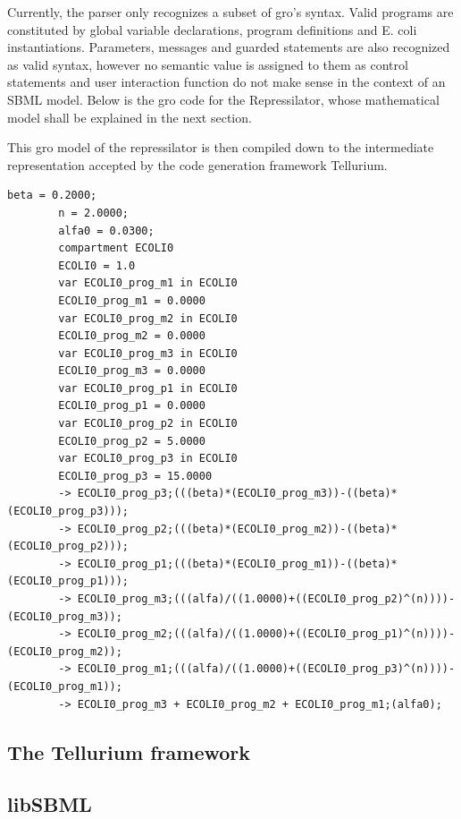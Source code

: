 \documentclass[12pt]{article}
\begin{document}
    Currently, the parser only recognizes a subset of gro's syntax. Valid programs are constituted by global variable declarations, program definitions and E. coli instantiations. Parameters, messages and guarded statements are also recognized as valid syntax, however no semantic value is assigned to them as control statements and user interaction function do not make sense in the context of an SBML model. Below is the gro code for the Repressilator, whose mathematical model shall be explained in the next section.
    
    
    
    This gro model of the repressilator is then compiled down to the intermediate representation accepted by the code generation framework Tellurium.
    
    \begin{lstlisting}[style=GROSRC]
        beta = 0.2000;
        n = 2.0000;
        alfa0 = 0.0300;
        compartment ECOLI0
        ECOLI0 = 1.0
        var ECOLI0_prog_m1 in ECOLI0
        ECOLI0_prog_m1 = 0.0000
        var ECOLI0_prog_m2 in ECOLI0
        ECOLI0_prog_m2 = 0.0000
        var ECOLI0_prog_m3 in ECOLI0
        ECOLI0_prog_m3 = 0.0000
        var ECOLI0_prog_p1 in ECOLI0
        ECOLI0_prog_p1 = 0.0000
        var ECOLI0_prog_p2 in ECOLI0
        ECOLI0_prog_p2 = 5.0000
        var ECOLI0_prog_p3 in ECOLI0
        ECOLI0_prog_p3 = 15.0000
        -> ECOLI0_prog_p3;(((beta)*(ECOLI0_prog_m3))-((beta)*(ECOLI0_prog_p3)));
        -> ECOLI0_prog_p2;(((beta)*(ECOLI0_prog_m2))-((beta)*(ECOLI0_prog_p2)));
        -> ECOLI0_prog_p1;(((beta)*(ECOLI0_prog_m1))-((beta)*(ECOLI0_prog_p1)));
        -> ECOLI0_prog_m3;(((alfa)/((1.0000)+((ECOLI0_prog_p2)^(n))))-(ECOLI0_prog_m3));
        -> ECOLI0_prog_m2;(((alfa)/((1.0000)+((ECOLI0_prog_p1)^(n))))-(ECOLI0_prog_m2));
        -> ECOLI0_prog_m1;(((alfa)/((1.0000)+((ECOLI0_prog_p3)^(n))))-(ECOLI0_prog_m1));
        -> ECOLI0_prog_m3 + ECOLI0_prog_m2 + ECOLI0_prog_m1;(alfa0);
    \end{lstlisting}
    
\subsection{The Tellurium framework}
    \lipsum[1]

\subsection{libSBML}
    \lipsum[1]
    
\end{document}
